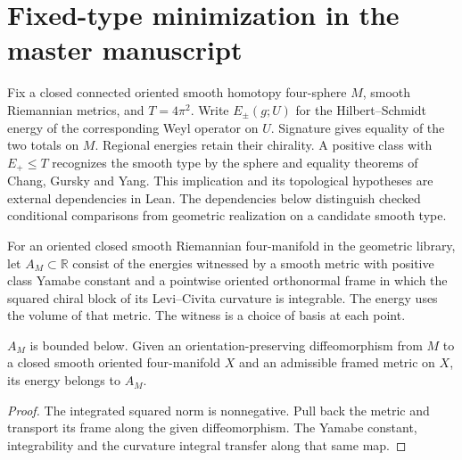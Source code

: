 \section{Fixed-type minimization in the master manuscript}
\label{sec:master-variational}

Fix a closed connected oriented smooth homotopy four-sphere \(M\), smooth
Riemannian metrics, and \(T=4\pi^2\). Write \(E_\pm(g;U)\) for the
Hilbert--Schmidt energy of the corresponding Weyl operator on \(U\).
Signature gives equality of the two totals on \(M\). Regional energies
retain their chirality. A positive class with \(E_+\le T\) recognizes
the smooth type by the sphere and equality theorems of Chang, Gursky
and Yang. This implication and its topological hypotheses are external
dependencies in Lean. The dependencies below distinguish checked conditional comparisons from
geometric realization on a candidate smooth type.

\begin{definition}
\label{def:master-admissible}
\leanok
For an oriented closed smooth Riemannian four-manifold in the geometric
library, let \(A_M\subset\mathbb R\) consist of the energies witnessed by
a smooth metric with positive class Yamabe constant and a pointwise
oriented orthonormal frame in which the squared chiral block of its
Levi--Civita curvature is integrable. The energy uses the volume of
that metric. The witness is a choice of basis at each point.
\end{definition}

\begin{lemma}
\label{lem:master-competitor}
\leanok
\(A_M\) is bounded below. Given an orientation-preserving
diffeomorphism from \(M\) to a closed smooth oriented four-manifold \(X\)
and an admissible framed metric on \(X\), its energy belongs to \(A_M\).
\end{lemma}
\begin{proof}
\leanok
The integrated squared norm is nonnegative. Pull back the metric and
transport its frame along the given diffeomorphism. The Yamabe constant,
integrability and the curvature integral transfer along that same map.
\end{proof}

